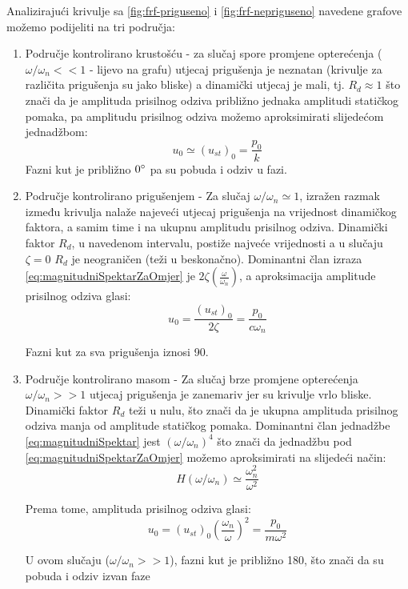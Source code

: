 Analizirajući krivulje sa \eqref{fig:frf-priguseno} i \eqref{fig:frf-nepriguseno} 
navedene grafove možemo podijeliti na tri područja:
\begin{enumerate}
    \item Područje kontrolirano krustošću - za slučaj spore promjene opterećenja
        ($\omega/\omega_n<<1$ - lijevo na grafu) utjecaj prigušenja je neznatan
        (krivulje za različita prigušenja su jako bliske) a dinamički utjecaj je mali, 
        tj. $R_d \approx 1$ što znači da je amplituda prisilnog odziva približno jednaka
        amplitudi statičkog pomaka, pa amplitudu prisilnog odziva možemo
        aproksimirati slijedećom jednadžbom:
        \begin{equation}\label{eq:frf_prvi_sektor}
            u_0\simeq(u_{st})_0=\frac{p_0}{k}
        \end{equation}
        Fazni kut je približno $0\degree$ pa su pobuda i odziv u fazi.

    \item Područje kontrolirano prigušenjem - Za slučaj $\omega/\omega_n\simeq 1$,
        izražen razmak između krivulja nalaže najeveći utjecaj prigušenja na
        vrijednost dinamičkog faktora, a samim time i na ukupnu amplitudu prisilnog
        odziva. Dinamički faktor $R_d$, u navedenom intervalu, postiže najveće
        vrijednosti a u slučaju $\zeta=0$ $R_d$ je neograničen (teži u beskonačno). 
        Dominantni član izraza \eqref{eq:magnitudniSpektarZaOmjer} je
        $2\zeta(\frac{\omega}{\omega_n})$, a aproksimacija amplitude prisilnog
        odziva glasi: 
        \begin{equation}\label{eq:frf_rezonanca}
            u_0=\frac{(u_{st})_0}{2\zeta}=\frac{p_0}{c\omega_n}
        \end{equation}

        Fazni kut za sva prigušenja iznosi 90\degree. 

    \item Područje kontrolirano masom - Za slučaj brze promjene opterećenja
        $\omega/\omega_n>>1$ utjecaj prigušenja je zanemariv jer su krivulje vrlo
        bliske. Dinamički faktor $R_d$ teži u nulu, što znači da je ukupna amplituda
        prisilnog odziva manja od amplitude statičkog pomaka. Dominantni član jednadžbe 
        \eqref{eq:magnitudniSpektar} jest $(\omega/\omega_n)^4$ što znači
        da jednadžbu pod \eqref{eq:magnitudniSpektarZaOmjer} možemo aproksimirati na 
        slijedeći način:
        \[
            H(\omega/\omega_n)\simeq \frac{\omega_n^2}{\omega^2}
        \]

        Prema tome, amplituda prisilnog odziva glasi:
        \begin{equation}\label{eq:frf_treci_sektor}
            u_0=(u_{st})_0\left(\frac{\omega_n}{\omega}\right)^2=\frac{p_0}{m\omega^2}
        \end{equation}
        
        U ovom slučaju ($\omega/\omega_n >> 1$), fazni kut je približno 180\degree,
        što znači da su pobuda i odziv izvan faze
\end{enumerate}


